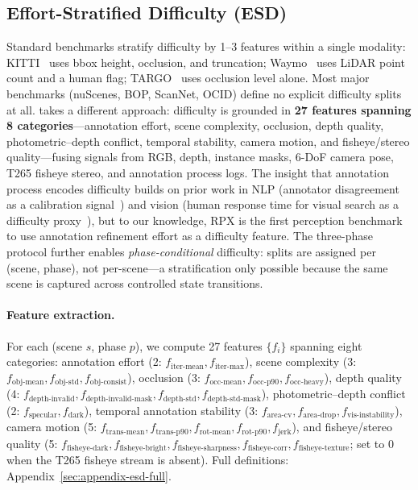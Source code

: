 \subsection{Effort-Stratified Difficulty (ESD)}
\label{sec:features}

Standard benchmarks stratify difficulty by 1--3 features within a single modality: KITTI~\citep{geiger2012kitti} uses bbox height, occlusion, and truncation; Waymo~\citep{sun2019waymo} uses LiDAR point count and a human flag; TARGO~\citep{xia2024targo} uses occlusion level alone.
Most major benchmarks (nuScenes, BOP, ScanNet, OCID) define no explicit difficulty splits at all.
\coolname{} takes a different approach: difficulty is grounded in \textbf{27 features spanning 8 categories}---annotation effort, scene complexity, occlusion, depth quality, photometric--depth conflict, temporal stability, camera motion, and fisheye/stereo quality---fusing signals from RGB, depth, instance masks, 6-DoF camera pose, T265 fisheye stereo, and annotation process logs.
The insight that annotation process encodes difficulty builds on prior work in NLP (annotator disagreement as a calibration signal~\citep{nie2020chaosNLI}) and vision (human response time for visual search as a difficulty proxy~\citep{ionescu2016hard}), but to our knowledge, RPX is the first perception benchmark to use annotation refinement effort as a difficulty feature.
The three-phase protocol further enables \textit{phase-conditional} difficulty: splits are assigned per (scene, phase), not per-scene---a stratification only possible because the same scene is captured across controlled state transitions.

\paragraph{Feature extraction.}
For each (scene $s$, phase $p$), we compute 27 features $\{f_i\}$ spanning eight categories:
annotation effort (2: $f_{\text{iter-mean}}, f_{\text{iter-max}}$),
scene complexity (3: $f_{\text{obj-mean}}, f_{\text{obj-std}}, f_{\text{obj-consist}}$),
occlusion (3: $f_{\text{occ-mean}}, f_{\text{occ-p90}}, f_{\text{occ-heavy}}$),
depth quality (4: $f_{\text{depth-invalid}}, f_{\text{depth-invalid-mask}}, f_{\text{depth-std}}, f_{\text{depth-std-mask}}$),
photometric--depth conflict (2: $f_{\text{specular}}, f_{\text{dark}}$),
temporal annotation stability (3: $f_{\text{area-cv}}, f_{\text{area-drop}}, f_{\text{vis-instability}}$),
camera motion (5: $f_{\text{trans-mean}}, f_{\text{trans-p90}}, f_{\text{rot-mean}}, f_{\text{rot-p90}}, f_{\text{jerk}}$),
and fisheye/stereo quality (5: $f_{\text{fisheye-dark}}, f_{\text{fisheye-bright}}, f_{\text{fisheye-sharpness}}, f_{\text{fisheye-corr}}, f_{\text{fisheye-texture}}$; set to 0 when the T265 fisheye stream is absent).
Full definitions: Appendix~\ref{sec:appendix-esd-full}.


